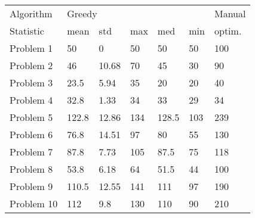 \begin{tabular}{lllllll}
\toprule
Algorithm & \multicolumn{5}{l}{Greedy} & Manual \\
Statistic &   mean &    std &  max &    med &  min & optim. \\
\midrule
Problem 1  &     50 &      0 &   50 &     50 &   50 &    100 \\
Problem 2  &     46 &  10.68 &   70 &     45 &   30 &     90 \\
Problem 3  &   23.5 &   5.94 &   35 &     20 &   20 &     40 \\
Problem 4  &   32.8 &   1.33 &   34 &     33 &   29 &     34 \\
Problem 5  &  122.8 &  12.86 &  134 &  128.5 &  103 &    239 \\
Problem 6  &   76.8 &  14.51 &   97 &     80 &   55 &    130 \\
Problem 7  &   87.8 &   7.73 &  105 &   87.5 &   75 &    118 \\
Problem 8  &   53.8 &   6.18 &   64 &   51.5 &   44 &    100 \\
Problem 9  &  110.5 &  12.55 &  141 &    111 &   97 &    190 \\
Problem 10 &    112 &    9.8 &  130 &    110 &   90 &    210 \\
\bottomrule
\end{tabular}
